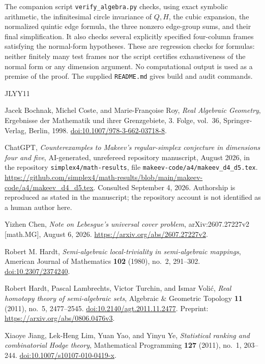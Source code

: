 \documentclass[11pt,reqno]{amsart}
\theoremstyle{definition}
\theoremstyle{remark}
\numberwithin{equation}{section}
\begin{document}
The companion script \texttt{verify\_algebra.py} checks, using exact
symbolic arithmetic, the infinitesimal circle invariance of $Q,H$,
the cubic expansion, the normalized quintic edge formula, the
three nonzero edge-group sums, and their final simplification.
It also checks several explicitly specified four-column frames
satisfying the normal-form hypotheses. These are regression checks
for formulas: neither finitely many test frames nor the script
certifies exhaustiveness of the normal form or any dimension
argument. No computational output is used as a premise of the
proof. The supplied \texttt{README.md} gives build and audit commands.

\begin{thebibliography}{JLYY11}

Jacek Bochnak, Michel Coste, and Marie-Fran\c{c}oise Roy,
\emph{Real Algebraic Geometry}, Ergebnisse der Mathematik und ihrer
Grenzgebiete, 3. Folge, vol.~36, Springer-Verlag, Berlin, 1998.
\href{https://doi.org/10.1007/978-3-662-03718-8}
{doi:10.1007/978-3-662-03718-8}.

ChatGPT,
\emph{Counterexamples to Makeev's regular-simplex conjecture in
dimensions four and five}, AI-generated, unrefereed repository
manuscript, August 2026, in the repository
\texttt{simplex4/math-results}, file
\texttt{makeev-code/a4/makeev\_d4\_d5.tex}.
\url{https://github.com/simplex4/math-results/blob/main/makeev-code/a4/makeev_d4_d5.tex}.
Consulted September 4, 2026. Authorship is reproduced as stated in
the manuscript; the repository account is not identified as a human
author here.

Yizhen Chen,
\emph{Note on Lebesgue's universal cover problem},
arXiv:2607.27227v2 [math.MG], August 6, 2026.
\url{https://arxiv.org/abs/2607.27227v2}.

Robert M. Hardt,
\emph{Semi-algebraic local-triviality in semi-algebraic mappings},
American Journal of Mathematics \textbf{102} (1980), no.~2, 291--302.
\href{https://doi.org/10.2307/2374240}{doi:10.2307/2374240}.

Robert Hardt, Pascal Lambrechts, Victor Turchin, and Ismar Voli\'c,
\emph{Real homotopy theory of semi-algebraic sets},
Algebraic \& Geometric Topology \textbf{11} (2011), no.~5, 2477--2545.
\href{https://doi.org/10.2140/agt.2011.11.2477}
{doi:10.2140/agt.2011.11.2477}.
Preprint: \url{https://arxiv.org/abs/0806.0476v3}.

Xiaoye Jiang, Lek-Heng Lim, Yuan Yao, and Yinyu Ye,
\emph{Statistical ranking and combinatorial Hodge theory},
Mathematical Programming \textbf{127} (2011), no.~1, 203--244.
\href{https://doi.org/10.1007/s10107-010-0419-x}
{doi:10.1007/s10107-010-0419-x}.


\end{thebibliography}
\end{document}
